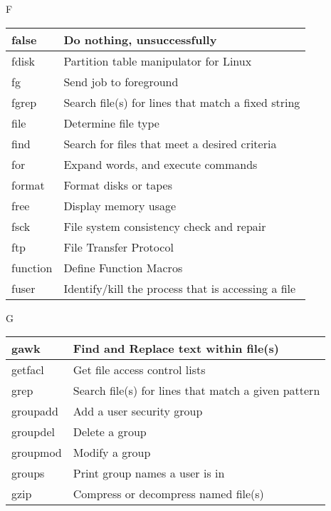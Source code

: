 \begin{flushleft}
\begin{tcolorbox}
	\textsc{F}
\end{tcolorbox}

\begin{tabular}{lp{12cm}}
	\hline
	false &	Do nothing, unsuccessfully \\
	\hline
	fdisk &	Partition table manipulator for Linux  \\
	\hline
	fg &	Send job to foreground \\ 
	\hline
	fgrep &	Search file(s) for lines that match a fixed string \\
	\hline
	file &	Determine file type \\ 
	\hline
	find &	Search for files that meet a desired criteria \\ 
	\hline
	for &	Expand words, and execute commands \\
	\hline
	format &	Format disks or tapes \\
	\hline
	free &	Display memory usage  \\
	\hline
	fsck &	File system consistency check and repair \\
	\hline
	ftp &	File Transfer Protocol  \\
	\hline
	function &	Define Function Macros \\
	\hline
	fuser &	Identify/kill the process that is accessing a file \\
	\hline
\end{tabular}

\newpage

\begin{tcolorbox}
	\textsc{G}
\end{tcolorbox}

\begin{tabular}{lp{12cm}}
	\hline
 	gawk &	Find and Replace text within file(s) \\
 	\hline
	getfacl &	Get file access control lists \\
	\hline
	grep &	Search file(s) for lines that match a given pattern \\
	\hline
	groupadd &	 Add a user security group \\
	\hline
	groupdel &	Delete a group \\
	\hline
	groupmod &	Modify a group \\
	\hline
	groups &	Print group names a user is in  \\
	\hline
	gzip &	Compress or decompress named file(s) \\
	\hline
\end{tabular}


\end{flushleft}
